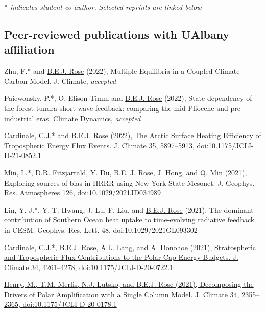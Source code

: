 \documentclass[11pt, letterpaper]{article} %
\newcommand{\years}[1]{\marginnote{\scriptsize #1}} %
\newcommand{\publink}{http://www.atmos.albany.edu/facstaff/brose/resources/Publications/}
\begin{document}
* \emph{indicates student co-author.} \emph{Selected reprints are linked below}

\subsection*{Peer-reviewed publications with UAlbany affiliation}  

\years{2022}
Zhu, F.* and \underline{B.E.J. Rose} (2022), Multiple Equilibria in a Coupled Climate-Carbon Model. J. Climate, \emph{accepted}
\vspace{0.2 cm} 

Paiewonsky, P.*, O. Elison Timm and \underline{B.E.J. Rose} (2022), State dependency of the forest-tundra-short wave feedback: comparing the mid-Pliocene and pre-industrial eras. Climate Dynamics, \emph{accepted}
\vspace{0.2 cm}

\href{\publink Cardinale_Rose_JClim2022accepted.pdf}{Cardinale, C.J.* and \underline{B.E.J. Rose} (2022), The Arctic Surface Heating Efficiency of Tropospheric Energy Flux Events. J. Climate 35, 5897--5913, doi:10.1175/JCLI-D-21-0852.1}
\vspace{0.2 cm} 

\years{2021}
Min, L.*, D.R. Fitzjarrald, Y. Du, \underline{B.E. J. Rose}, J. Hong, and Q. Min (2021), Exploring sources of bias in HRRR using New York State Mesonet. J. Geophys. Res. Atmospheres 126, doi:10.1029/2021JD034989
\vspace{0.2 cm}

Lin, Y.-J.*, Y.-T. Hwang, J. Lu, F. Liu, and \underline{B.E.J. Rose} (2021), The dominant contribution of Southern Ocean heat uptake to time-evolving radiative feedback in CESM. Geophys. Res. Lett. 48, doi:10.1029/2021GL093302
\vspace{0.2 cm}

\href{\publink Cardinale_etal_JClim2021.pdf}{Cardinale, C.J.*, \underline{B.E.J. Rose}, A.L. Lang, and A. Donohoe (2021), Stratospheric and Tropospheric Flux Contributions to the Polar Cap Energy Budgets. J. Climate 34, 4261--4278, doi:10.1175/JCLI-D-20-0722.1}
\vspace{0.2 cm}

\href{\publink Henry_etal_JClim2021.pdf}{Henry, M., T.M. Merlis, N.J. Lutsko, and \underline{B.E.J. Rose} (2021), Decomposing the Drivers of Polar Amplification with a Single Column Model. J. Climate 34, 2355--2365, doi:10.1175/JCLI-D-20-0178.1}
\vspace{0.2 cm}
\end{document}
